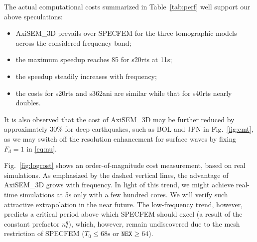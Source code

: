 \documentclass[extra]{gji}
\begin{document}
The actual computational costs summarized in Table~\ref{tab:perf}
well support our above speculations:
\begin{itemize}
\item AxiSEM\_3D prevails over SPECFEM for the three tomographic models 
across the considered frequency band;
\item the maximum speedup reaches 85 for s20rts at 11s;
\item the speedup steadily increases with frequency;  
\item the costs for s20rts and s362ani are similar while that for s40rts 
nearly doubles.
\end{itemize}
It is also observed that the cost of AxiSEM\_3D may be further reduced by 
approximately 30\% for deep earthquakes, 
such as BOL and JPN in Fig.~\ref{fig:cmt}, 
as we may switch off the resolution enhancement for surface waves 
by fixing $F_d=1$ in \eqref{eq:nu}.

Fig.~\ref{fig:logcost} shows an order-of-magnitude cost measurement, 
based on real simulations. 
As emphasized by the dashed vertical lines,
the advantage of AxiSEM\_3D grows with frequency. 
In light of this trend, we might achieve real-time simulations at 5s
only with a few hundred cores. We will verify such 
attractive extrapolation in the near future.
The low-frequency trend, however, predicts a critical period above which 
SPECFEM should excel (a result of the constant prefactor $n_c^q$), 
which, however, remain undiscovered due to the mesh restriction
of SPECFEM ($T_0 \le 68\text{s}$ or $\mathtt{NEX} \ge 64$).
\end{document}
